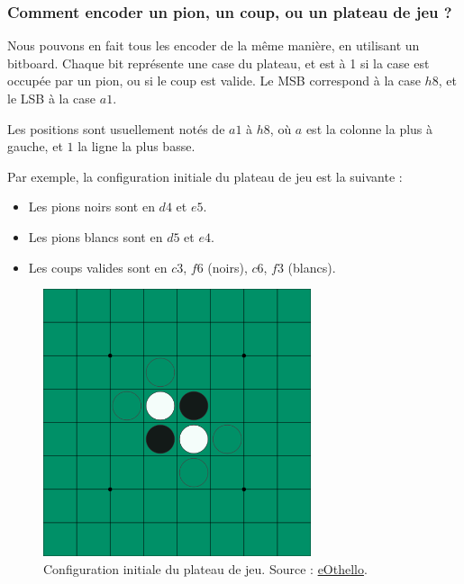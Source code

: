 \subsubsection{Comment encoder un pion, un coup, ou un plateau de jeu ?}
\label{subsubsec:enc}
Nous pouvons en fait tous les encoder de la même manière, en utilisant un bitboard. Chaque bit représente une case du plateau, et est à 1 si la case est occupée par un pion, ou si le coup est valide. Le \ac{MSB} correspond à la case $h8$, et le \ac{LSB} à la case $a1$.

Les positions sont usuellement notés de $a1$ à $h8$, où $a$ est la colonne la plus à gauche, et $1$ la ligne la plus basse. \cite{brian_rose_2005} 

Par exemple, la configuration initiale du plateau de jeu est la suivante :
\begin{itemize}
    \item Les pions noirs sont en $d4$ et $e5$.
    \item Les pions blancs sont en $d5$ et $e4$.
    \item Les coups valides sont en $c3$, $f6$ (noirs), $c6$, $f3$ (blancs).
\end{itemize}

\begin{figure}[H]
    \centering
    \includegraphics[width=0.7\textwidth]{ressources/plateau_init.png}
    \caption{Configuration initiale du plateau de jeu. Source : \href{https://www.eothello.com/}{eOthello}.}
    \label{fig:init_board}
\end{figure}


